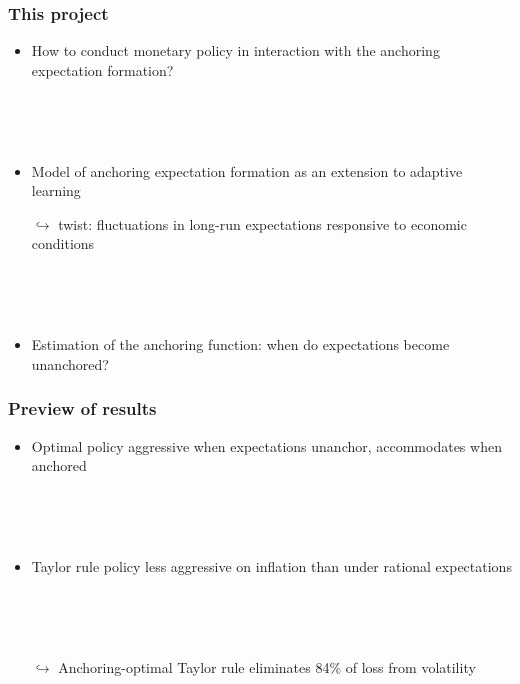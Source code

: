 \documentclass[10pt]{beamer}
\def\ppFEunanchors{0.5 }
\def\movei{5 }
\begin{document}
\begin{frame}
	\frametitle{This project}
	
	\begin{itemize}
	\item How to conduct monetary policy in interaction with the anchoring expectation formation?
	
	\
	
	\

	\item Model of anchoring expectation formation as an extension to adaptive learning \\
	
	\vspace{0.2cm}
	
	$ \hookrightarrow$ twist: fluctuations in long-run expectations responsive to economic conditions
	
	
	\
	
	\
	
	\item Estimation of the anchoring function: when do expectations become unanchored?

	\end{itemize}
	\end{frame}


\begin{frame}
	\frametitle{Preview of results}
	
	\vspace{0.5cm}
	
	\begin{itemize}
%
%	
%	
%	
	
%	
%	
%	
%	
%	
	\item Optimal policy aggressive when expectations unanchor, accommodates when anchored
	
	\
	
	\
	

	\item Taylor rule policy less aggressive on inflation than under rational expectations
	
	\
	
	\
	
	\item[$\hookrightarrow$] Anchoring-optimal Taylor rule eliminates 84\% of loss from volatility


	\end{itemize}


\end{frame}
\end{document}
